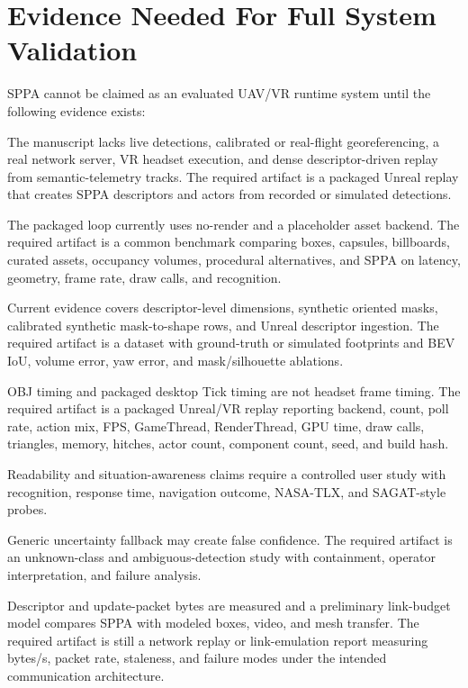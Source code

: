 ﻿\documentclass[11pt,a4paper]{article}
\begin{document}
\section{Evidence Needed For Full System Validation}

SPPA cannot be claimed as an evaluated UAV/VR runtime system until the following
evidence exists:

\begin{description}[leftmargin=1.3cm,style=nextline]
    \item[End-to-end representation loop.] The manuscript lacks live detections,
    calibrated or real-flight georeferencing, a real network server, VR headset
    execution, and dense descriptor-driven replay from semantic-telemetry
    tracks. The required artifact is a packaged Unreal replay that creates SPPA
    descriptors and actors from recorded or simulated detections.
    \item[Shared baseline benchmark.] The packaged loop currently uses
    no-render and a placeholder asset backend. The required artifact is a common
    benchmark comparing boxes, capsules, billboards, curated assets, occupancy
    volumes, procedural alternatives, and SPPA on latency, geometry, frame rate,
    draw calls, and recognition.
    \item[Real shape adaptation.] Current evidence covers descriptor-level
    dimensions, synthetic oriented masks, calibrated synthetic mask-to-shape
    rows, and Unreal descriptor ingestion. The required artifact is a dataset
    with ground-truth or simulated footprints and BEV IoU, volume error, yaw
    error, and mask/silhouette ablations.
    \item[VR runtime.] OBJ timing and packaged desktop Tick timing are not
    headset frame timing. The required artifact is a packaged Unreal/VR replay
    reporting backend, count, poll rate, action mix, FPS, GameThread,
    RenderThread, GPU time, draw calls, triangles, memory, hitches, actor count,
    component count, seed, and build hash.
    \item[Operator evidence.] Readability and situation-awareness claims require
    a controlled user study with recognition, response time, navigation outcome,
    NASA-TLX, and SAGAT-style probes.
    \item[Fallback evidence.] Generic uncertainty fallback may create false
    confidence. The required artifact is an unknown-class and
    ambiguous-detection study with containment, operator interpretation, and
    failure analysis.
    \item[Bandwidth comparison.] Descriptor and update-packet bytes are measured
    and a preliminary link-budget model compares SPPA with modeled boxes,
    video, and mesh transfer. The required artifact is still a network replay or
    link-emulation report measuring bytes/s, packet rate, staleness, and failure
    modes under the intended communication architecture.
\end{description}
\end{document}
